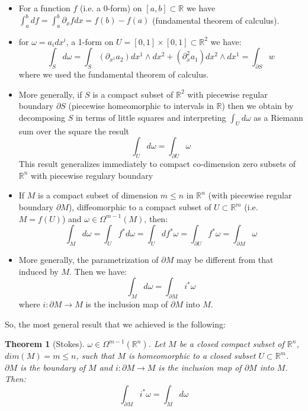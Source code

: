 \documentclass[a4paper,11pt,titlepage]{article}
\numberwithin{equation}{section}
\newtheorem{theorem}{Theorem}[section]
\theoremstyle{definition}
\theoremstyle{remark}
\newcommand{\rfield}{\mathbb{R}}
\begin{document}
\begin{itemize}
  \item For a function $f$ (i.e. a 0-form) on $[a, b] \subset \rfield$ we have $\int_a^b df = \int_a^b \partial_x f dx = f(b) - f(a)$ (fundamental theorem of calculus).
  \item for $\omega = a_i dx^i$, a 1-form on $U = [0, 1] \times [0, 1] \subset \rfield^2$ we have:
  $$\int_S d\omega = \int_S (\partial_{x^1} a_2) dx^1 \wedge dx^2 + (\partial_x^2 a_1) dx^2 \wedge dx^1 = \int_{\partial S} w$$
  where we used the fundamental theorem of calculus.
  \item More generally, if $S$ is a compact subset of $\rfield^2$ with piecewise regular boundary $\partial S$ (piecewise homeomorphic to intervals in $\rfield$) then we obtain by decomposing $S$ in terms of little squares and interpreting $\int_U d\omega$ as a Riemann sum over the square the result
  $$\int_U d\omega = \int_{\partial U} \omega$$
  This result generalizes immediately to compact co-dimension zero subsets of $\rfield^n$ with piecewise regulary boundary
  \item If $M$ is a compact subset of dimension $m \le n$ in $\rfield^n$ (with piecewise regular boundary $\partial M$), diffeomorphic to a compact subset of $U \subset \rfield^m$ (i.e. $M = f(U)$) and $\omega \in \Omega^{m-1}(M)$, then:
  $$\int_M d\omega = \int_U f^* d\omega = \int_U df^* \omega = \int_{\partial U} f^* \omega = \int_{\partial M} \omega$$
  \item More generally, the parametrization of $\partial M$ may be different from that induced by $M$. Then we have:
  $$\int_M d\omega = \int_{\partial M} i^* \omega$$
  where $i \colon \partial M \rightarrow M$ is the inclusion map of $\partial M$ into $M$.
\end{itemize}

So, the most general result that we achieved is the following:

\begin{theorem}[Stokes]
  $\omega \in \Omega^{m-1}(\rfield^n)$. Let $M$ be a closed compact subset of $\rfield^n$, $dim(M) = m \le n$, such that $M$ is homeomorphic to a closed subset $U \subset \rfield^m$. $\partial M$ is the boundary of $M$ and $i \colon \partial M \rightarrow M$ is the inclusion map of $\partial M$ into $M$. Then:
  \begin{equation}
    \int_{\partial M} i^* \omega = \int_M d\omega
  \end{equation}
\end{theorem}
\end{document}
